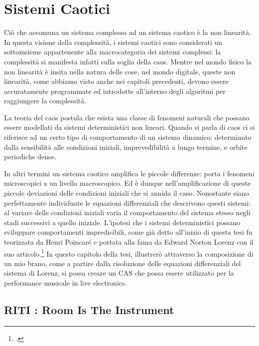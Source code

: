 
\section{Sistemi Caotici}
\label{sec:Sistemi Caotici}

Ciò che accomuna un sistema complesso ad un sistema caotico è la non linearità.
In questa visione della complessità, i sistemi caotici sono considerati un sottoinsieme 
appartenente alla macrocategoria dei sistemi complessi: la complessità 
si manifesta infatti sulla soglia della caos. 
Mentre nel mondo fisico la non linearità è insita nella natura
delle cose, nel mondo digitale, queste non linearità, come abbiamo visto
anche nei capitoli precedenti, devono essere accuratamente
programmate ed introdotte all’interno degli algoritmi per raggiungere la complessità. 

La teoria del caos postula che esista una classe di fenomeni naturali che
possano essere modellati da sistemi deterministici non lineari.
Quando si parla di caos ci si riferisce ad un certo tipo di comportamento di
un sistema dinamico: determinato dalla sensibilità alle condizioni iniziali,
imprevedibilità a lungo termine, e orbite periodiche dense. 

In altri termini un sistema caotico amplifica le piccole differenze: porta i fenomeni microscopici
a un livello macroscopico. Ed è dunque nell’amplificazione di queste piccole
deviazioni delle condizioni iniziali che si annida il caso.
Nonostante siano perfettamente individuate le equazioni differenziali che
descrivono questi sistemi: al variare delle condizioni iniziali 
varia il comportamento del sistema stesso negli stadi successivi a quello iniziale.
L’ipotesi che i sistemi deterministici possano sviluppare comportamenti impredicibili, 
come già detto all'inizio di questa tesi fu teorizzata da Henri Poincaré e portata alla
fama da Edward Norton Lorenz con il suo articolo.\footcite{Lorenzdnf}
In questo capitolo della tesi, illustrerò attraverso la composizione di un mio brano, 
come a partire dalla risoluzione delle equazioni differenziali del sistema di Lorenz, si possa
creare un CAS che possa essere utilizzato per la
performance musicale in live electronics.

\subsection{RITI : Room Is The Instrument}
\label{RITI : Room Is The Instrument}

